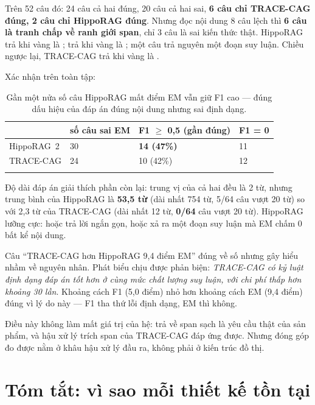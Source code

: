 Trên 52 câu đó: 24 câu cả hai đúng, 20 câu cả hai sai, \textbf{6 câu chỉ TRACE-CAG đúng, 2
câu chỉ HippoRAG đúng}. Nhưng đọc nội dung 8 câu lệch thì \textbf{6 câu là tranh chấp về
ranh giới span}, chỉ 3 câu là sai kiến thức thật. HippoRAG trả  khi vàng là
; trả  khi vàng là
; một câu trả nguyên một đoạn suy luận. Chiều ngược lại,
TRACE-CAG trả  khi vàng là .

Xác nhận trên toàn tập:

\begin{longtable}{L{4.2cm} R{2.6cm} R{3.4cm} R{2.6cm}}
\toprule
& \textbf{số câu sai EM} & \textbf{F1 $\geq$ 0,5 (gần đúng)} & \textbf{F1 = 0}\\
\midrule
\endhead
HippoRAG~2 & 30 & \textbf{14 (47\%)} & 11\\
TRACE-CAG & 24 & 10 (42\%) & 12\\
\bottomrule
\caption{Gần một nửa số câu HippoRAG mất điểm EM vẫn giữ F1 cao --- đúng dấu hiệu của đáp án
đúng nội dung nhưng sai định dạng.}
\end{longtable}

Độ dài đáp án giải thích phần còn lại: trung vị của cả hai đều là 2 từ, nhưng trung bình của
HippoRAG là \textbf{53,5 từ} (dài nhất 754 từ, 5/64 câu vượt 20 từ) so với 2,3 từ của
TRACE-CAG (dài nhất 12 từ, \textbf{0/64} câu vượt 20 từ). HippoRAG lưỡng cực: hoặc trả lời
ngắn gọn, hoặc xả ra một đoạn suy luận mà EM chấm 0 bất kể nội dung.

\begin{luuy}
Câu ``TRACE-CAG hơn HippoRAG 9,4 điểm EM'' đúng về số nhưng gây hiểu nhầm về nguyên nhân.
Phát biểu chịu được phản biện: \emph{TRACE-CAG có kỷ luật định dạng đáp án tốt hơn ở cùng
mức chất lượng suy luận, với chi phí thấp hơn khoảng 30 lần}. Khoảng cách F1 (5,0 điểm) nhỏ
hơn khoảng cách EM (9,4 điểm) đúng vì lý do này --- F1 tha thứ lỗi định dạng, EM thì không.

Điều này không làm mất giá trị của hệ: trả về span sạch là yêu cầu thật của sản phẩm, và
hậu xử lý trích span của TRACE-CAG đáp ứng được. Nhưng đóng góp đo được nằm ở khâu hậu xử lý
đầu ra, không phải ở kiến trúc đồ thị.
\end{luuy}

\section{Tóm tắt: vì sao mỗi thiết kế tồn tại}


